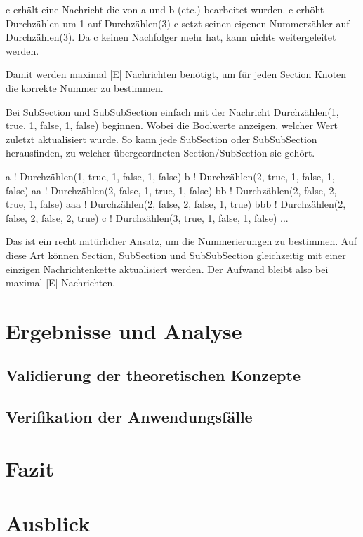 c erhält eine Nachricht die von a und b (etc.) bearbeitet wurden.
c erhöht Durchzählen um 1 auf Durchzählen(3)
c setzt seinen eigenen Nummerzähler auf Durchzählen(3).
Da c keinen Nachfolger mehr hat, kann nichts weitergeleitet werden.

Damit werden maximal |E| Nachrichten benötigt, um für jeden Section Knoten
die korrekte Nummer zu bestimmen.


Bei SubSection und SubSubSection einfach mit der
Nachricht Durchzählen(1, true, 1, false, 1, false) beginnen.
Wobei die Boolwerte anzeigen, welcher Wert zuletzt aktualisiert wurde.
So kann jede SubSection oder SubSubSection herausfinden, zu welcher
übergeordneten Section/SubSection sie gehört.

a ! Durchzählen(1, true, 1, false, 1, false)
b ! Durchzählen(2, true, 1, false, 1, false)
aa ! Durchzählen(2, false, 1, true, 1, false)
bb ! Durchzählen(2, false, 2, true, 1, false)
aaa ! Durchzählen(2, false, 2, false, 1, true)
bbb ! Durchzählen(2, false, 2, false, 2, true)
c ! Durchzählen(3, true, 1, false, 1, false)
...

Das ist ein recht natürlicher Ansatz, um die Nummerierungen zu bestimmen.
Auf diese Art können Section, SubSection und SubSubSection gleichzeitig
mit einer einzigen Nachrichtenkette aktualisiert werden.
Der Aufwand bleibt also bei maximal |E| Nachrichten.


\chapter{Ergebnisse und Analyse}

\section{Validierung der theoretischen Konzepte}

\section{Verifikation der Anwendungsfälle}

\chapter{Fazit}


\chapter{Ausblick}


